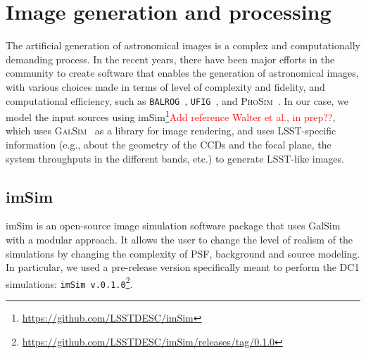 \documentclass[twocolumn]{aastex62}
\begin{document}
\section{Image generation and processing}
\label{sec:image_generation_pipeline}

The artificial generation of astronomical images is a complex and computationally demanding process. In the recent
years, there have been major efforts in the community to create software that enables the generation of astronomical images, with various choices made in terms of level of complexity and fidelity, and computational efficiency, such as \texttt{BALROG}~\citep{2016MNRAS.457..786S}, \texttt{UFIG}~\citep{2016ApJ...817...25B}, and \textsc{PhoSim}~\citep{2015ApJS..218...14P}. In our case, we model the input sources using imSim\footnote{\url{https://github.com/LSSTDESC/imSim}}\textcolor{red}{Add reference Walter et al., in prep??}, which uses \textsc{GalSim}~\citep{2015A&C....10..121R} as a library for image rendering, and uses LSST-specific information (e.g., about the geometry of the CCDs and the focal plane, the system throughputs in the different bands, etc.) to generate LSST-like images.

\subsection{imSim}
\label{sec:imsim_pipeline}

imSim is an open-source image simulation software package that uses GalSim with a modular approach. It allows the user to change the level of realism of the simulations by changing the complexity of PSF, background and source modeling. In particular, we used a pre-release version specifically meant to perform the DC1 simulations: \texttt{imSim v.0.1.0}\footnote{\url{https://github.com/LSSTDESC/imSim/releases/tag/0.1.0}}.
\end{document}
